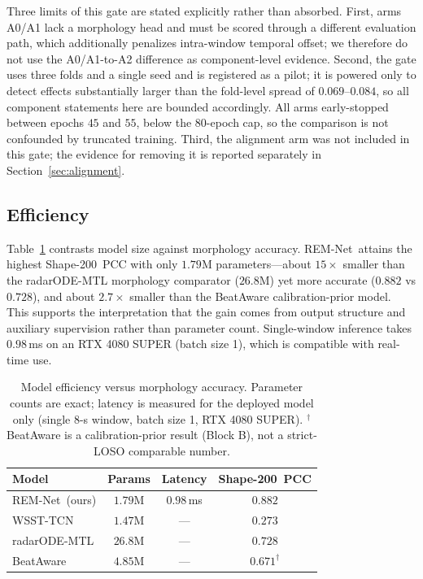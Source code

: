 \documentclass[lettersize,journal]{IEEEtran}
\newcommand{\remnet}{REM-Net\xspace}
\newcommand{\shape}{Shape-200\xspace}
\begin{document}
Three limits of this gate are stated explicitly rather than absorbed. First, arms A0/A1 lack a morphology head and must be scored through a different evaluation path, which additionally penalizes intra-window temporal offset; we therefore do not use the A0/A1-to-A2 difference as component-level evidence. Second, the gate uses three folds and a single seed and is registered as a pilot; it is powered only to detect effects substantially larger than the fold-level spread of $0.069$--$0.084$, so all component statements here are bounded accordingly. All arms early-stopped between epochs $45$ and $55$, below the $80$-epoch cap, so the comparison is not confounded by truncated training. Third, the alignment arm was not included in this gate; the evidence for removing it is reported separately in Section~\ref{sec:alignment}.

\subsection{Efficiency}
Table~\ref{tab:efficiency} contrasts model size against morphology accuracy. \remnet\ attains the highest \shape\ PCC with only $1.79$M parameters---about $15\times$ smaller than the radarODE-MTL morphology comparator ($26.8$M) yet more accurate ($0.882$ vs $0.728$), and about $2.7\times$ smaller than the BeatAware calibration-prior model. This supports the interpretation that the gain comes from output structure and auxiliary supervision rather than parameter count. Single-window inference takes $0.98$\,ms on an RTX 4080 SUPER (batch size 1), which is compatible with real-time use.

\begin{table}[!t]
\centering
\caption{Model efficiency versus morphology accuracy. Parameter counts are exact; latency is measured for the deployed model only (single 8-s window, batch size 1, RTX 4080 SUPER). $^{\dagger}$BeatAware is a calibration-prior result (Block B), not a strict-LOSO comparable number.}
\label{tab:efficiency}
\begin{tabular}{lccc}
\toprule
Model & Params & Latency & \shape\ PCC \\
\midrule
\remnet\ (ours)   & $\mathbf{1.79}$M & $0.98$\,ms & $\mathbf{0.882}$ \\
WSST-TCN          & $1.47$M & --- & $0.273$ \\
radarODE-MTL      & $26.8$M & --- & $0.728$ \\
BeatAware & $4.85$M & --- & $0.671^{\dagger}$ \\
\bottomrule
\end{tabular}
\end{table}
\end{document}
